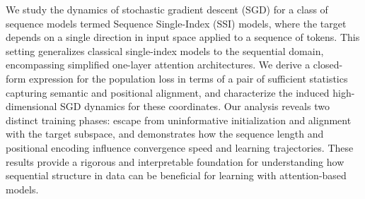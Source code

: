 We study the dynamics of stochastic gradient descent (SGD) for a class of sequence models termed Sequence Single-Index (SSI) models, where the target depends on a single direction in input space applied to a sequence of tokens. This setting generalizes classical single-index models to the sequential domain, encompassing simplified one-layer attention architectures. We derive a closed-form expression for the population loss in terms of a pair of sufficient statistics capturing semantic and positional alignment, and characterize the induced high-dimensional SGD dynamics for these coordinates. Our analysis reveals two distinct training phases: escape from uninformative initialization and alignment with the target subspace, and demonstrates how the sequence length and positional encoding influence convergence speed and learning trajectories. These results provide a rigorous and interpretable foundation for understanding how sequential structure in data can be beneficial for learning with attention-based models.
